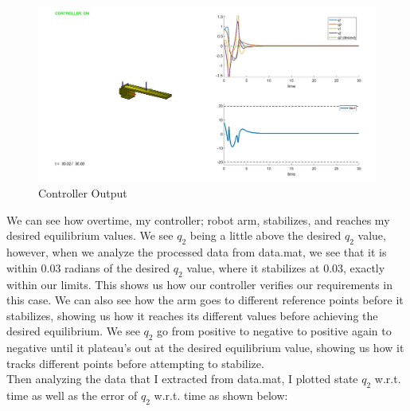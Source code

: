 \documentclass[12pt]{article}
\begin{document}
\begin{figure}[H]
	\centering
	\includegraphics[width=0.8\linewidth]{Controller with disturbance rejection.jpg}
	\caption{Controller Output}
\end{figure}

We can see how overtime, my controller; robot arm, stabilizes, and reaches my desired equilibrium values. We see $q_{2}$ being a little above the desired $q_{2}$ value, however, when we analyze the processed data from data.mat, we see that it is within 0.03 radians of the desired $q_{2}$ value, where it stabilizes at 0.03, exactly within our limits. This shows us how our controller verifies our requirements in this case. We can also see how the arm goes to different reference points before it stabilizes, showing us how it reaches its different values before achieving the desired equilibrium. We see $q_{2}$ go from positive to negative to positive again to negative until it plateau's out at the desired equilibrium value, showing us how it tracks different points before attempting to stabilize. \\

Then analyzing the data that I extracted from data.mat, I plotted state $q_{2}$ w.r.t. time as well as the error of $q_{2}$ w.r.t. time as shown below:
\end{document}
